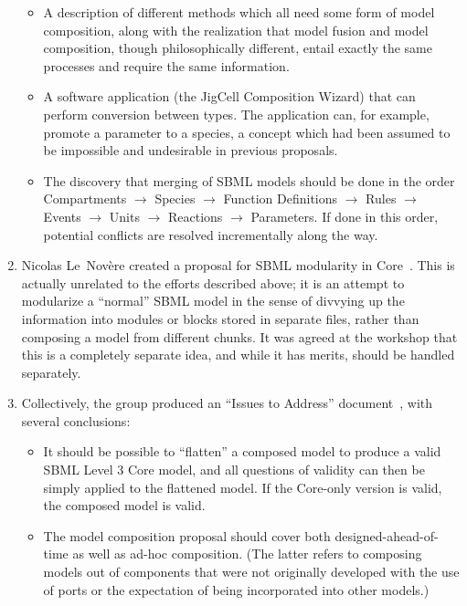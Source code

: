 \begin{enumerate}
  \begin{itemize}

  \item A description of different methods which all need some form of
    model composition, along with the realization that model fusion
    and model composition, though philosophically different, entail
    exactly the same processes and require the same information.

  \item A software application (the JigCell Composition Wizard) that
    can perform conversion between types.  The application can, for
    example, promote a parameter to a species, a concept which had
    been assumed to be impossible and undesirable in previous
    proposals.  

  \item The discovery that merging of SBML models should be done in
    the order Compartments $\rightarrow$ Species  $\rightarrow$
    Function Definitions  $\rightarrow$ Rules  $\rightarrow$ Events
    $\rightarrow$ Units  $\rightarrow$ Reactions  $\rightarrow$
    Parameters.  If done in this order, potential conflicts are
    resolved incrementally along the way.

  \end{itemize}

\item Nicolas Le~Nov\`{e}re created a proposal for SBML modularity in
  Core~\citep{lenov:2007}.  This is actually unrelated to the efforts
  described above; it is an attempt to modularize a ``normal'' SBML
  model in the sense of divvying up the information into modules or
  blocks stored in separate files, rather than composing a model from
  different chunks.  It was agreed at the workshop that this is a
  completely separate idea, and while it has merits, should be handled
  separately.

\item Collectively, the group produced an ``Issues to Address''
  document~\citep{various:2007}, with several conclusions:

  \begin{itemize}

  \item It should be possible to ``flatten'' a composed model to
    produce a valid SBML Level 3 Core model, and all questions of
    validity can then be simply applied to the flattened model.  If
    the Core-only version is valid, the composed model is valid.

  \item The model composition proposal should cover both
    designed-ahead-of-time as well as ad-hoc composition. (The latter
    refers to composing models out of components that were not
    originally developed with the use of ports or the expectation of
    being incorporated into other models.)


\end{itemize}
\end{enumerate}
